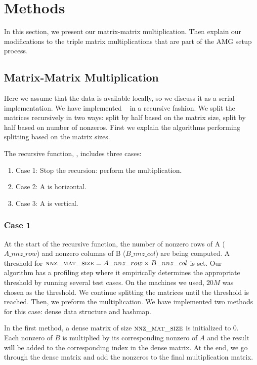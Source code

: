 \section{Methods}
\label{sec:methods}

In this section, we present our matrix-matrix multiplication. Then explain our modifications to the triple matrix multiplications that are part of the AMG setup process.

\subsection{Matrix-Matrix Multiplication}
\label{sec:matmult}

Here we assume that the data is available locally, so we discuss it as a serial implementation. We have implemented \mm~ in a recursive fashion. We split the matrices recursively in two ways: split by half based on the matrix size, split by half based on number of nonzeros. First we explain the algorithms performing splitting based on the matrix sizes.

The recursive function, \recmm, includes three cases:
\begin{enumerate}
 \item Case 1: Stop the recursion: perform the multiplication.
 \item Case 2: A is horizontal.
 \item Case 3: A is vertical.
\end{enumerate}

\subsubsection{Case 1}
\label{sec:case1}
At the start of the recursive function, the number of nonzero rows of A ($A\_nnz\_row$) and nonzero columns of B ($B\_nnz\_col$) are being computed. A threshold for $\textsc{nnz\_mat\_size} = A\_nnz\_row \times B\_nnz\_col$ is set. Our algorithm has a profiling step where it empirically determines the appropriate threshold by running several test cases. On the machines we used,  $20M$ was chosen as the threshold. We continue splitting the matrices until the threshold is reached. Then, we preform the multiplication. We have implemented two methods for this case: dense data structure and hashmap.

In the first method, a dense matrix of size $\textsc{nnz\_mat\_size}$ is initialized to $0$. Each nonzero of $B$ is multiplied by its corresponding nonzero of $A$ and the result will be added to the corresponding index in the dense matrix. At the end, we go through the dense matrix and add the nonzeros to the final multiplication matrix.

